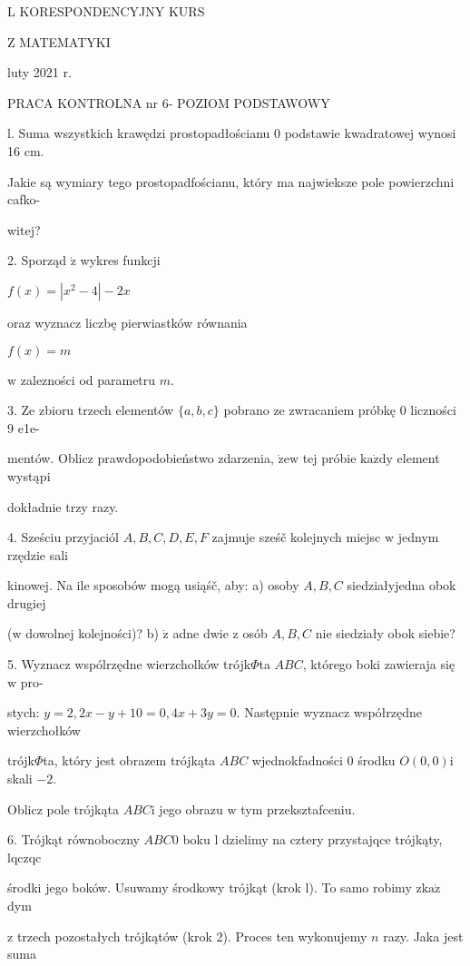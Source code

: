 \documentclass[a4paper,12pt]{article}
\begin{document}
L KORESPONDENCYJNY KURS

Z MATEMATYKI

luty 2021 r.

PRACA KONTROLNA nr 6- POZIOM PODSTAWOWY

l. Suma wszystkich krawędzi prostopadłościanu $0$ podstawie kwadratowej wynosi 16 cm.

Jakie są wymiary tego prostopadfościanu, który ma najwieksze pole powierzchni cafko-

witej?

2. Sporząd $\acute{\mathrm{z}}$ wykres funkcji

$f(x)=|x^{2}-4|-2x$

oraz wyznacz liczbę pierwiastków równania

$f(x)=m$

$\mathrm{w}$ zalezności od parametru $m.$

3. Ze zbioru trzech elementów $\{a,b,c\}$ pobrano ze zwracaniem próbkę $0$ liczności 9 e1e-

mentów. Oblicz prawdopodobieństwo zdarzenia, $\dot{\mathrm{z}}\mathrm{e}\mathrm{w}$ tej próbie $\mathrm{k}\mathrm{a}\dot{\mathrm{z}}\mathrm{d}\mathrm{y}$ element wystąpi

dokładnie trzy razy.

4. Sześciu przyjaciól $A, B, C, D, E, F$ zajmuje sześč kolejnych miejsc $\mathrm{w}$ jednym rzędzie sali

kinowej. Na ile sposobów mogą usiąśč, aby: a) osoby $A, B, C$ siedziałyjedna obok drugiej

($\mathrm{w}$ dowolnej kolejności)? b) $\dot{\mathrm{z}}$ adne dwie $\mathrm{z}$ osób $A, B, C$ nie siedziały obok siebie?

5. Wyznacz wspólrzędne wierzcholków trójk$\Phi$ta $ABC$, którego boki zawieraja się $\mathrm{w}$ pro-

stych: $y=2, 2x-y+10=0, 4x+3y=0$. Następnie wyznacz współrzędne wierzchołków

trójk$\Phi$ta, który jest obrazem trójkąta $ABC$ wjednokfadności $0$ środku $O(0,0)\mathrm{i}$ skali $-2.$

Oblicz pole trójkąta $ABC\mathrm{i}$ jego obrazu $\mathrm{w}$ tym przeksztafceniu.

6. Trójkąt równoboczny $ABC 0$ boku l dzielimy na cztery przystajqce trójkąty, lqczqc

środki jego boków. Usuwamy środkowy trójkąt (krok l). To samo robimy $\mathrm{z} \mathrm{k}\mathrm{a}\dot{\mathrm{z}}$ dym

$\mathrm{z}$ trzech pozostałych trójkątów (krok 2). Proces ten wykonujemy $n$ razy. Jaka jest suma
\end{document}
